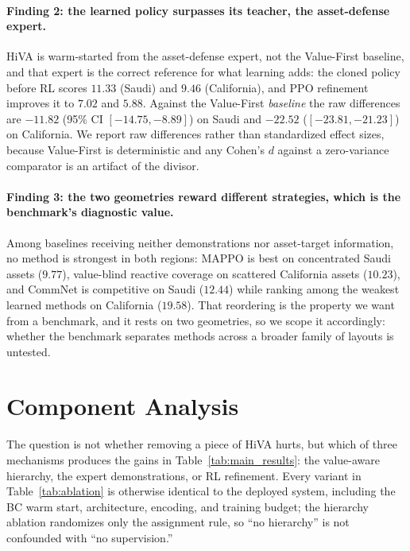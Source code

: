 \documentclass[letterpaper]{article}
\begin{document}
\paragraph{Finding 2: the learned policy surpasses its teacher, the asset-defense expert.} HiVA is warm-started from the asset-defense expert, not the Value-First baseline, and that expert is the correct reference for what learning adds: the cloned policy before RL scores $11.33$ (Saudi) and $9.46$ (California), and PPO refinement improves it to $7.02$ and $5.88$. Against the Value-First \emph{baseline} the raw differences are $-11.82$ (95\% CI $[-14.75, -8.89]$) on Saudi and $-22.52$ ($[-23.81, -21.23]$) on California. We report raw differences rather than standardized effect sizes, because Value-First is deterministic and any Cohen's $d$ against a zero-variance comparator is an artifact of the divisor.

\paragraph{Finding 3: the two geometries reward different strategies, which is the benchmark's diagnostic value.} Among baselines receiving neither demonstrations nor asset-target information, no method is strongest in both regions: MAPPO is best on concentrated Saudi assets ($9.77$), value-blind reactive coverage on scattered California assets ($10.23$), and CommNet is competitive on Saudi ($12.44$) while ranking among the weakest learned methods on California ($19.58$). That reordering is the property we want from a benchmark, and it rests on two geometries, so we scope it accordingly: whether the benchmark separates methods across a broader family of layouts is untested.

\section{Component Analysis}
\label{sec:ablation}

The question is not whether removing a piece of HiVA hurts, but which of three mechanisms produces the gains in Table~\ref{tab:main_results}: the value-aware hierarchy, the expert demonstrations, or RL refinement. Every variant in Table~\ref{tab:ablation} is otherwise identical to the deployed system, including the BC warm start, architecture, encoding, and training budget; the hierarchy ablation randomizes only the assignment rule, so ``no hierarchy'' is not confounded with ``no supervision.''
\end{document}
